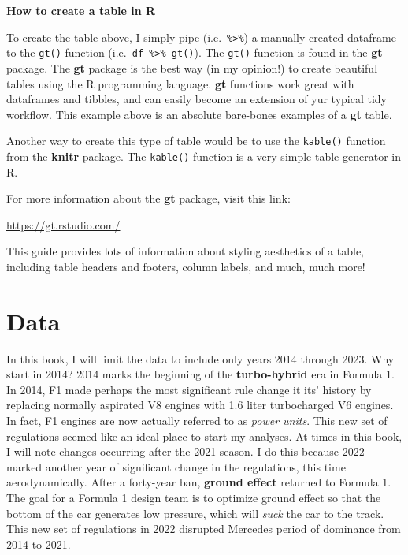 \documentclass[
]{book}
\begin{document}
\begin{blackbox}

\begin{center}
\textbf{How to create a table in R}

\end{center}

To create the table above, I simply pipe (i.e.~\texttt{\%\textgreater{}\%}) a manually-created dataframe to the \texttt{gt()} function (i.e.~\texttt{df\ \%\textgreater{}\%\ gt()}). The \texttt{gt()} function is found in the \textbf{gt} package. The \textbf{gt} package is the best way (in my opinion!) to create beautiful tables using the R programming language. \textbf{gt} functions work great with dataframes and tibbles, and can easily become an extension of yur typical tidy workflow. This example above is an absolute bare-bones examples of a \textbf{gt} table.

Another way to create this type of table would be to use the \texttt{kable()} function from the \textbf{knitr} package. The \texttt{kable()} function is a very simple table generator in R.

For more information about the \textbf{gt} package, visit this link:

\url{https://gt.rstudio.com/}

This guide provides lots of information about styling aesthetics of a table, including table headers and footers, column labels, and much, much more!

\end{blackbox}

\hypertarget{data-1}{%
\section{Data}\label{data-1}}

In this book, I will limit the data to include only years 2014 through 2023. Why start in 2014? 2014 marks the beginning of the \textbf{turbo-hybrid} era in Formula 1. In 2014, F1 made perhaps the most significant rule change it its' history by replacing normally aspirated V8 engines with 1.6 liter turbocharged V6 engines. In fact, F1 engines are now actually referred to as \emph{power units}. This new set of regulations seemed like an ideal place to start my analyses. At times in this book, I will note changes occurring after the 2021 season. I do this because 2022 marked another year of significant change in the regulations, this time aerodynamically. After a forty-year ban, \textbf{ground effect} returned to Formula 1. The goal for a Formula 1 design team is to optimize ground effect so that the bottom of the car generates low pressure, which will \emph{suck} the car to the track. This new set of regulations in 2022 disrupted Mercedes period of dominance from 2014 to 2021.
\end{document}
